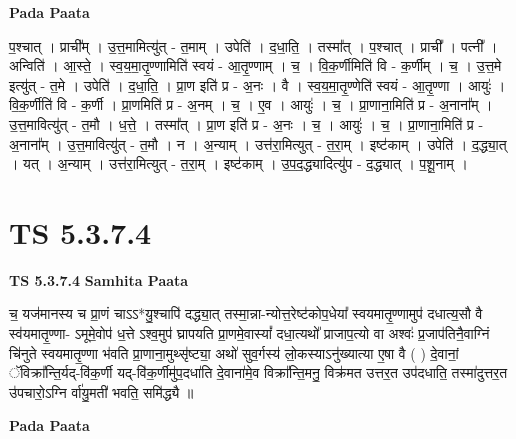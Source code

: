 \documentclass[17pt]{extarticle}
\begin{document}
\textbf{Pada Paata} \newline

प॒श्चात् । प्राची᳚म् । उ॒त्त॒मामित्यु॑त् - त॒माम् । उपेति॑ । द॒धा॒ति॒ । तस्मा᳚त् । प॒श्चात् । प्राची᳚ । पत्नी᳚ । अन्विति॑ । आ॒स्ते॒ । स्व॒य॒मा॒तृ॒ण्णामिति॑ स्वयं - आ॒तृ॒ण्णाम् । च॒ । वि॒क॒र्णीमिति॑ वि - क॒र्णीम् । च॒ । उ॒त्त॒मे इत्यु॑त् - त॒मे । उपेति॑ । द॒धा॒ति॒ । प्रा॒ण इति॑ प्र - अ॒नः । वै । स्व॒य॒मा॒तृ॒ण्णेति॑ स्वयं - आ॒तृ॒ण्णा । आयुः॑ । वि॒क॒र्णीति॑ वि - क॒र्णी । प्रा॒णमिति॑ प्र - अ॒नम् । च॒ । ए॒व । आयुः॑ । च॒ । प्रा॒णाना॒मिति॑ प्र - अ॒नाना᳚म् । उ॒त्त॒मावित्यु॑त् - त॒मौ । ध॒त्ते॒ । तस्मा᳚त् । प्रा॒ण इति॑ प्र - अ॒नः । च॒ । आयुः॑ । च॒ । प्रा॒णाना॒मिति॑ प्र - अ॒नाना᳚म् । उ॒त्त॒मावित्यु॑त् - त॒मौ । न । अ॒न्याम् । उत्त॑रा॒मित्युत् - त॒रा॒म् । इष्ट॑काम् । उपेति॑ । द॒द्ध्या॒त् । यत् । अ॒न्याम् । उत्त॑रा॒मित्युत् - त॒रा॒म् । इष्ट॑काम् । उ॒प॒द॒द्ध्यादित्यु॑प - द॒द्ध्यात् । प॒शू॒नाम् ।  \newline





\section{ TS 5.3.7.4 }

\textbf{TS 5.3.7.4 } \newline
\textbf{Samhita Paata} \newline

च॒ यज॑मानस्य च प्रा॒णं चाऽऽ*यु॒श्चापि॑ दद्ध्या॒त् तस्मा॒न्ना-न्योत्त॒रेष्ट॑कोप॒धेया᳚ स्वयमातृ॒ण्णामुप॑ दधात्य॒सौ वै स्व॑यमातृ॒ण्णा- ऽमूमे॒वोप॑ ध॒त्ते ऽश्व॒मुप॑ घ्रापयति प्रा॒णमे॒वास्यां᳚ दधा॒त्यथो᳚ प्राजाप॒त्यो वा अश्वः॑ प्र॒जाप॑तिनै॒वाग्निं चि॑नुते स्वयमातृ॒ण्णा भ॑वति प्रा॒णाना॒मुथ्सृ॑ष्ट्या॒ अथो॑ सुव॒र्गस्य॑ लो॒कस्याऽनु॑ख्यात्या ए॒षा वै ( ) दे॒वानां॒ ॅविक्रा᳚न्ति॒र्यद्-वि॑क॒र्णी यद्-वि॑क॒र्णीमु॑प॒दधा॑ति दे॒वाना॑मे॒व विक्रा᳚न्ति॒मनु॒ विक्र॑मत उत्तर॒त उप॑दधाति॒ तस्मा॑दुत्तर॒त उ॑पचारो॒ऽग्नि र्वा॑यु॒मती॑ भवति॒ समि॑द्ध्यै ॥ \newline

\textbf{Pada Paata} \newline
\end{document}
